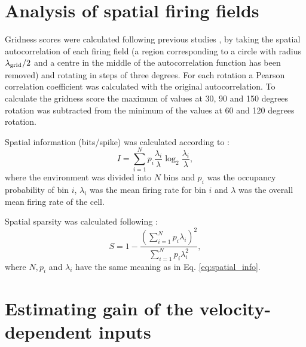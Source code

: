 \documentclass[a4paper,12pt]{article}
\newcommand{\ssc}[3]{\ensuremath{#1_{\text{#2}_{\text{#3}}}}}
\newcommand{\lamgrid}{\ssc{\lambda}{\scriptsize{grid}}{}}
\begin{document}
\section{Analysis of spatial firing fields}

Gridness scores were calculated following previous studies
\citep{Sargolini:2006ba}, by taking the spatial autocorrelation of each firing
field (a region corresponding to a circle with radius $\lamgrid/2$ and a centre
in the middle of the autocorrelation function has been removed) and rotating in
steps of three degrees. For each rotation a Pearson correlation coefficient was
calculated with the original autocorrelation. To calculate the gridness score
the maximum of values at 30, 90 and 150 degrees rotation was subtracted from
the minimum of the values at 60 and 120 degrees rotation.

Spatial information (bits/spike) was calculated according to
\citep{Skaggs:1996du}:
\begin{equation}
    I = \sum_{i = 1}^N p_i \frac{\lambda_i}{\lambda} \log_2 \frac{\lambda_i}{\lambda},
    \label{eq:spatial_info}
\end{equation}
where the environment was divided into $N$ bins and $p_i$ was the
occupancy probability of bin $i$, $\lambda_i$ was the mean firing rate for bin
$i$ and $\lambda$ was the overall mean firing rate of the cell.

Spatial sparsity was calculated following \citep{Buetfering:2014gu}:
\begin{equation}
    S = 1 - \frac{\left(\displaystyle \sum_{i = 1}^N p_i
    \lambda_i\right)^2}{\displaystyle \sum_{i = 1}^N p_i \lambda_i^2},
    \label{eq:spatial_sparsity}
\end{equation}
where $N, p_i$ and $\lambda_i$ have the same meaning as in Eq.
\eqref{eq:spatial_info}.


\section{Estimating gain of the velocity-dependent inputs} \label{sec:gain_est}
\end{document}
